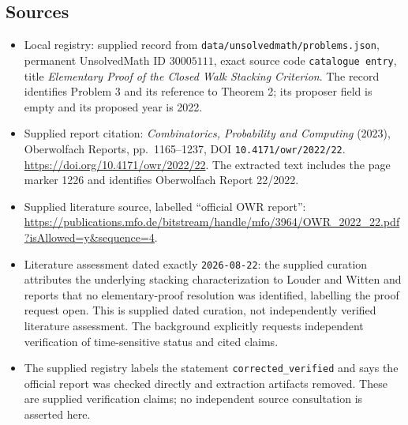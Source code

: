 \documentclass[11pt]{article}
\begin{document}
\subsection{Sources}
\begin{itemize}
\item Local registry: supplied record from \texttt{data/unsolvedmath/problems.json}, permanent UnsolvedMath ID \(30005111\), exact source code \texttt{catalogue entry}, title \emph{Elementary Proof of the Closed Walk Stacking Criterion}. The record identifies Problem 3 and its reference to Theorem 2; its proposer field is empty and its proposed year is 2022.
\item Supplied report citation: \emph{Combinatorics, Probability and Computing} (2023), Oberwolfach Reports, pp.\ 1165--1237, DOI \texttt{10.4171/owr/2022/22}. \url{https://doi.org/10.4171/owr/2022/22}. The extracted text includes the page marker 1226 and identifies Oberwolfach Report 22/2022.
\item Supplied literature source, labelled ``official OWR report'': \url{https://publications.mfo.de/bitstream/handle/mfo/3964/OWR_2022_22.pdf?isAllowed=y&sequence=4}.
\item Literature assessment dated exactly \texttt{2026-08-22}: the supplied curation attributes the underlying stacking characterization to Louder and Witten and reports that no elementary-proof resolution was identified, labelling the proof request open. This is supplied dated curation, not independently verified literature assessment. The background explicitly requests independent verification of time-sensitive status and cited claims.
\item The supplied registry labels the statement \texttt{corrected\_verified} and says the official report was checked directly and extraction artifacts removed. These are supplied verification claims; no independent source consultation is asserted here.
\end{itemize}
\end{document}
